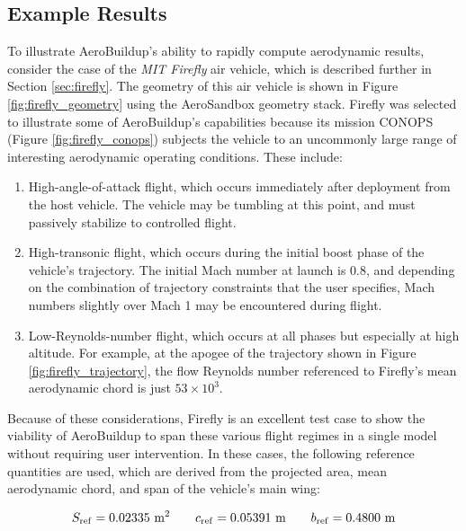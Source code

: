 \subsection{Example Results}

To illustrate AeroBuildup's ability to rapidly compute aerodynamic results, consider the case of the \emph{MIT Firefly} air vehicle, which is described further in Section \ref{sec:firefly}. The geometry of this air vehicle is shown in Figure \ref{fig:firefly_geometry} using the AeroSandbox geometry stack. Firefly was selected to illustrate some of AeroBuildup's capabilities because its mission CONOPS (Figure \ref{fig:firefly_conops}) subjects the vehicle to an uncommonly large range of interesting aerodynamic operating conditions. These include:

\begin{enumerate}
    \item High-angle-of-attack flight, which occurs immediately after deployment from the host vehicle. The vehicle may be tumbling at this point, and must passively stabilize to controlled flight.

    \item High-transonic flight, which occurs during the initial boost phase of the vehicle's trajectory. The initial Mach number at launch is $0.8$, and depending on the combination of trajectory constraints that the user specifies, Mach numbers slightly over Mach 1 may be encountered during flight.

    \item Low-Reynolds-number flight, which occurs at all phases but especially at high altitude. For example, at the apogee of the trajectory shown in Figure \ref{fig:firefly_trajectory}, the flow Reynolds number referenced to Firefly's mean aerodynamic chord is just $53 \times 10^3$.

\end{enumerate}

Because of these considerations, Firefly is an excellent test case to show the viability of AeroBuildup to span these various flight regimes in a single model without requiring user intervention. In these cases, the following reference quantities are used, which are derived from the projected area, mean aerodynamic chord, and span of the vehicle's main wing:

\begin{equation}
    S_{\rm ref} = 0.02335\ \text{m}^2 \qquad c_{\rm ref} = 0.05391\ \text{m} \qquad b_{\rm ref} = 0.4800\ \text{m}
\end{equation}

